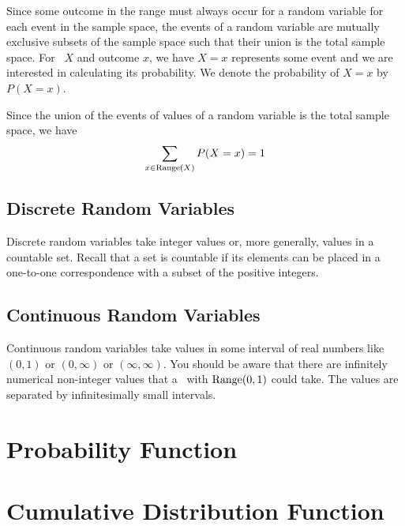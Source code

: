 Since some outcome in the range must always occur for a random variable for each event in the sample space, the events of a random variable are mutually exclusive subsets of the sample space such that their union is the total sample space. For \rv~$X$ and outcome $x$, we have $X = x$ represents some event and we are interested in calculating its probability. We denote the probability of $X = x$ by $P(X = x)$.
\begin{info}
Since the union of the events of values of a random variable is the total sample space, we have
\[
    \sum_{x \in \operatorname{Range}(X)} P(X=x) = 1
\]
\end{info}
\subsection*{Discrete Random Variables}
Discrete random variables take integer values or, more generally, values in a countable set. Recall that a set is countable if its elements can be placed in a one-to-one correspondence with a subset of the positive integers.
\subsection*{Continuous Random Variables}
Continuous random variables take values in some interval of real numbers like $(0,1)$ or $(0,\infty)$ or $(\infty,\infty)$. You should be aware that there are infinitely numerical non-integer values that a \rv~with $\operatorname{Range}(0,1)$ could take. The values are separated by infinitesimally small intervals.
\section{Probability Function}
\lipsum[1]
\section{Cumulative Distribution Function}
\lipsum[3]
